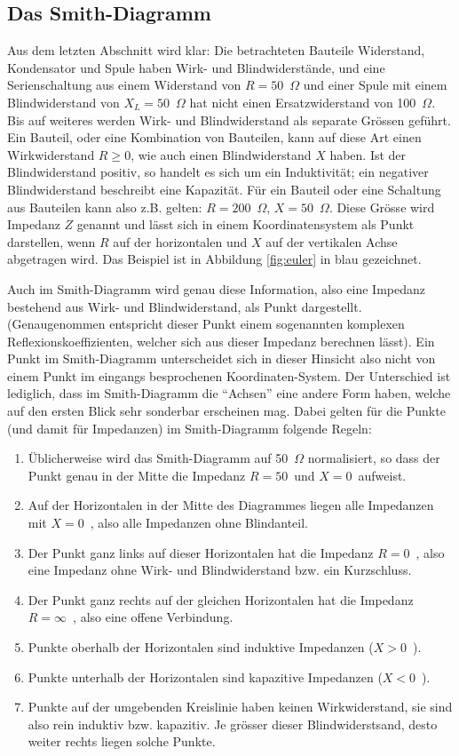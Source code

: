 \documentclass[twoside,a4paper,11pt,halfparskip,DIV=11,notitlepage]{scrartcl}
\begin{document}
\subsection{Das Smith-Diagramm}\label{sec:smith}
Aus dem letzten Abschnitt wird klar: Die betrachteten Bauteile Widerstand, Kondensator und Spule haben Wirk- und
Blindwiderstände, und eine Serienschaltung aus einem Widerstand von
$R=50$~$\Omega$ und einer Spule mit einem Blindwiderstand von $X_L=50$~$\Omega$ hat nicht einen Ersatzwiderstand
von 100~$\Omega$. Bis auf weiteres werden Wirk- und Blindwiderstand als separate Grössen geführt. Ein Bauteil,
oder eine Kombination von Bauteilen, kann auf diese Art einen Wirkwiderstand
$R\ge0$, wie auch einen Blindwiderstand $X$ haben. Ist der Blindwiderstand positiv, so handelt es sich um ein
Induktivität; ein negativer Blindwiderstand beschreibt eine Kapazität. Für ein Bauteil oder eine Schaltung
aus Bauteilen kann also z.B. gelten: $R=200$~$\Omega$, $X=50$~$\Omega$. Diese Grösse wird Impedanz $Z$ genannt
und lässt sich in einem Koordinatensystem als Punkt darstellen, wenn $R$ auf
der horizontalen und $X$ auf der vertikalen Achse abgetragen wird. Das Beispiel
ist in Abbildung \ref{fig:euler} in  blau gezeichnet. 

Auch im Smith-Diagramm wird genau diese Information, also eine Impedanz bestehend aus Wirk- und Blindwiderstand,
als Punkt dargestellt. (Genaugenommen entspricht dieser Punkt einem sogenannten komplexen Reflexionskoeffizienten,
welcher sich aus dieser Impedanz berechnen lässt). Ein Punkt im Smith-Diagramm unterscheidet sich in dieser Hinsicht also nicht
von einem Punkt im eingangs besprochenen Koordinaten-System. Der Unterschied ist lediglich, dass im Smith-Diagramm
die ``Achsen'' eine andere Form haben, welche auf den ersten Blick sehr sonderbar erscheinen mag.
Dabei gelten für die Punkte (und damit für Impedanzen) im Smith-Diagramm folgende Regeln:


\begin{enumerate}
\item Üblicherweise wird das Smith-Diagramm auf 50~$\Omega$ normalisiert, so dass
    der Punkt genau in der Mitte die Impedanz $R=50$~\Ohm und $X=0$~\Ohm aufweist.
\item Auf der Horizontalen in der Mitte des Diagrammes liegen alle Impedanzen mit $X=0$~\Ohm, also alle Impedanzen
    ohne Blindanteil.
\item Der Punkt ganz links auf dieser Horizontalen hat die Impedanz $R=0$~\Ohm, also eine Impedanz ohne Wirk- und Blindwiderstand
    bzw. ein Kurzschluss.
\item Der Punkt ganz rechts auf der gleichen Horizontalen hat die Impedanz $R=\infty$~\Ohm, also eine offene Verbindung.
\item Punkte oberhalb der Horizontalen sind induktive Impedanzen ($X>0$~\Ohm).
\item Punkte unterhalb der Horizontalen sind kapazitive Impedanzen ($X<0$~\Ohm).
\item Punkte auf der umgebenden Kreislinie haben keinen Wirkwiderstand, sie sind also rein induktiv bzw. kapazitiv.
    Je grösser dieser Blindwiderstsand, desto weiter rechts liegen solche Punkte.
\end{enumerate}
\end{document}
